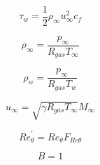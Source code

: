 \begin{equation}
\tau_w=\frac{1}{2}\rho_{\infty}u_{\infty}^{2}c_f
\end{equation}

\begin{equation}
\rho_\infty=\frac{p_\infty}{R_{gas}T_\infty}
\end{equation}

\begin{equation}
\rho_w=\frac{p_\infty}{R_{gas}T_w}
\end{equation}

\begin{equation}
u_\infty=\sqrt{{\gamma}R_{gas}T_\infty}M_\infty
\end{equation}

\begin{equation}
{Re}_{\theta}^{'}=Re_{\theta}F_{Re\theta}
\end{equation}

\begin{equation}
B=1
\end{equation}


